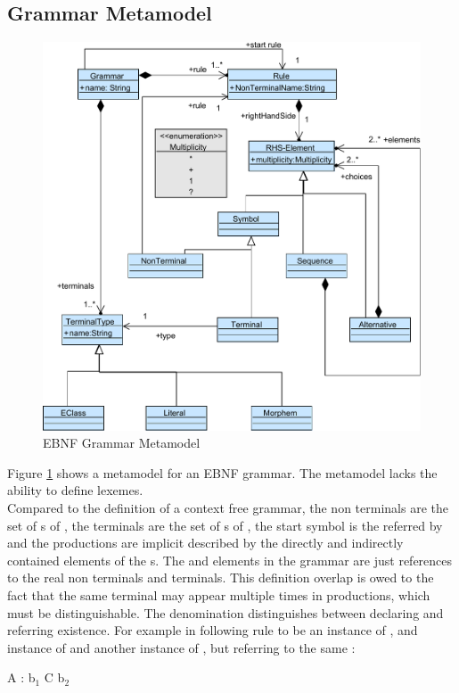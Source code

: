 \subsection{Grammar Metamodel}
\begin{figure}
\centering
\includegraphics[scale=0.85]{gfx/ex/Grammar_CFG} 
\caption{EBNF Grammar Metamodel}
\label{MM:EBNF}
\end{figure}

Figure \ref{MM:EBNF} shows a metamodel for an EBNF grammar. The metamodel lacks the ability to define lexemes.  \\
Compared to the definition of a context free grammar, the non terminals are the set of s of , the terminals are the set of s of , the start symbol is the  referred by  and the productions are implicit described by the directly and indirectly contained elements of the s. The  and  elements in the grammar are just references to the real non terminals and terminals. This definition overlap is owed to the fact that the same terminal may appear multiple times in productions, which must be distinguishable. The denomination distinguishes between declaring and referring existence. For example in following rule  to be an instance of ,  and instance of  and  another instance of , but referring to the same :
\\\begin{code}
A : b$_1$ C b$_2$
\end{code}\\

